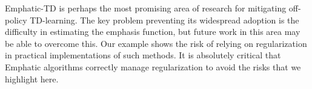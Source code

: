 Emphatic-TD is perhaps the most promising area of research for mitigating off-policy TD-learning. The key problem preventing its widespread adoption is the difficulty in estimating the emphasis function, but future work in this area may be able to overcome this. Our example shows the risk of relying on regularization in practical implementations of such methods. It is absolutely critical that Emphatic algorithms correctly manage regularization to avoid the risks that we highlight here.

% 
